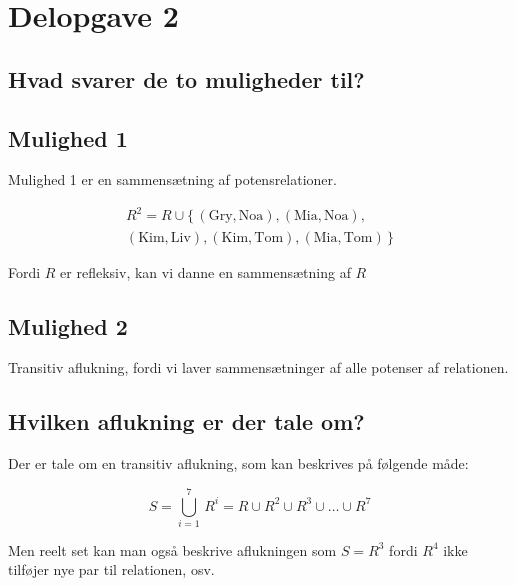 \section{Delopgave 2}\label{sec:delopgave-2}

\subsection{Hvad svarer de to muligheder til?}\label{subsec:hvad-svarer-de-to-muligheder-til?}

\subsection*{Mulighed 1}

Mulighed 1 er en sammensætning af potensrelationer.

\begin{equation}
    \begin{split}
        R^2 = R \cup \{\,(\text{Gry}, \text{Noa}), (\text{Mia}, \text{Noa}), \\
        (\text{Kim}, \text{Liv}), (\text{Kim}, \text{Tom}), (\text{Mia}, \text{Tom})\,\}
    \end{split}\label{eq:equation7}
\end{equation}

Fordi \(R\) er refleksiv, kan vi danne en sammensætning af \(R\) \subsection*{Mulighed 2} Transitiv aflukning, fordi vi
laver sammensætninger af alle potenser af relationen.

\subsection{Hvilken aflukning er der tale om?}\label{subsec:hvilken-aflukning-er-der-tale-om?}
Der er tale om en transitiv aflukning, som kan beskrives på følgende måde:

\begin{equation}
    S = \bigcup_{i=1}^{7} \, R^{i} = R \cup R^2 \cup R^3 \cup \ldots \cup R^7 \label{eq:equation6}
\end{equation}

Men reelt set kan man også beskrive aflukningen som \(S = R^{3}\) fordi \(R^4\) ikke tilføjer nye par til relationen,
osv.
